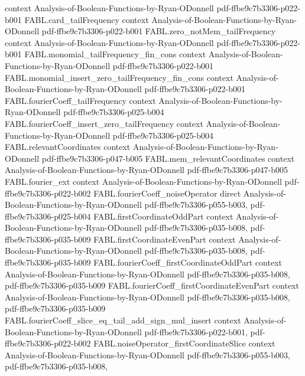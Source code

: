 \begin{theorem}
  {context}
  {Analysis-of-Boolean-Functions-by-Ryan-ODonnell}
  {pdf-ffbe9c7b3306-p022-b001}
\proofstep
  {FABL.card_tailFrequency}
  {context}
  {Analysis-of-Boolean-Functions-by-Ryan-ODonnell}
  {pdf-ffbe9c7b3306-p022-b001}
\proofstep
  {FABL.zero_notMem_tailFrequency}
  {context}
  {Analysis-of-Boolean-Functions-by-Ryan-ODonnell}
  {pdf-ffbe9c7b3306-p022-b001}
\proofstep
  {FABL.monomial_tailFrequency_fin_cons}
  {context}
  {Analysis-of-Boolean-Functions-by-Ryan-ODonnell}
  {pdf-ffbe9c7b3306-p022-b001}
\proofstep
  {FABL.monomial_insert_zero_tailFrequency_fin_cons}
  {context}
  {Analysis-of-Boolean-Functions-by-Ryan-ODonnell}
  {pdf-ffbe9c7b3306-p022-b001}
\proofstep
  {FABL.fourierCoeff_tailFrequency}
  {context}
  {Analysis-of-Boolean-Functions-by-Ryan-ODonnell}
  {pdf-ffbe9c7b3306-p025-b004}
\proofstep
  {FABL.fourierCoeff_insert_zero_tailFrequency}
  {context}
  {Analysis-of-Boolean-Functions-by-Ryan-ODonnell}
  {pdf-ffbe9c7b3306-p025-b004}
\proofstep
  {FABL.relevantCoordinates}
  {context}
  {Analysis-of-Boolean-Functions-by-Ryan-ODonnell}
  {pdf-ffbe9c7b3306-p047-b005}
\proofstep
  {FABL.mem_relevantCoordinates}
  {context}
  {Analysis-of-Boolean-Functions-by-Ryan-ODonnell}
  {pdf-ffbe9c7b3306-p047-b005}
\proofstep
  {FABL.fourier_ext}
  {context}
  {Analysis-of-Boolean-Functions-by-Ryan-ODonnell}
  {pdf-ffbe9c7b3306-p022-b002}
\proofstep
  {FABL.fourierCoeff_noiseOperator}
  {direct}
  {Analysis-of-Boolean-Functions-by-Ryan-ODonnell}
  {pdf-ffbe9c7b3306-p055-b003,
    pdf-ffbe9c7b3306-p025-b004}
\proofstep
  {FABL.firstCoordinateOddPart}
  {context}
  {Analysis-of-Boolean-Functions-by-Ryan-ODonnell}
  {pdf-ffbe9c7b3306-p035-b008,
    pdf-ffbe9c7b3306-p035-b009}
\proofstep
  {FABL.firstCoordinateEvenPart}
  {context}
  {Analysis-of-Boolean-Functions-by-Ryan-ODonnell}
  {pdf-ffbe9c7b3306-p035-b008,
    pdf-ffbe9c7b3306-p035-b009}
\proofstep
  {FABL.fourierCoeff_firstCoordinateOddPart}
  {context}
  {Analysis-of-Boolean-Functions-by-Ryan-ODonnell}
  {pdf-ffbe9c7b3306-p035-b008,
    pdf-ffbe9c7b3306-p035-b009}
\proofstep
  {FABL.fourierCoeff_firstCoordinateEvenPart}
  {context}
  {Analysis-of-Boolean-Functions-by-Ryan-ODonnell}
  {pdf-ffbe9c7b3306-p035-b008,
    pdf-ffbe9c7b3306-p035-b009}
\proofstep
  {FABL.fourierCoeff_slice_eq_tail_add_sign_mul_insert}
  {context}
  {Analysis-of-Boolean-Functions-by-Ryan-ODonnell}
  {pdf-ffbe9c7b3306-p022-b001,
    pdf-ffbe9c7b3306-p022-b002}
\proofstep
  {FABL.noiseOperator_firstCoordinateSlice}
  {context}
  {Analysis-of-Boolean-Functions-by-Ryan-ODonnell}
  {pdf-ffbe9c7b3306-p055-b003,
    pdf-ffbe9c7b3306-p035-b008,
}
\end{theorem}
